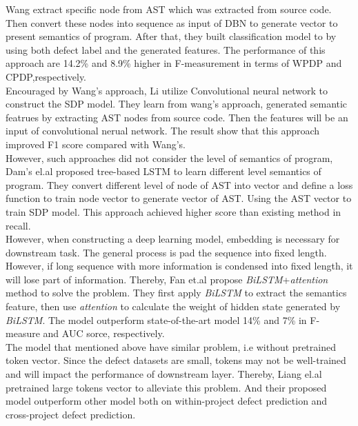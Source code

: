 Wang \cite{} extract specific node from AST which was extracted from source code. Then convert these nodes into sequence as input of DBN to generate vector to present semantics of program. After that, they built classification model to by using both defect label and the generated features. The performance of this approach are 14.2\% and 8.9\% higher in F-measurement in terms of WPDP and CPDP,respectively.\\

Encouraged by Wang's approach, Li \cite{} utilize Convolutional neural network to construct the SDP model. They learn from wang's approach, generated semantic featrues by extracting AST nodes from source code. Then the features will be an input of convolutional nerual network. The result show that this approach improved F1 score compared with Wang's.\\

However, such approaches did not consider the level of semantics of program, Dam's el.al \cite{} proposed tree-based LSTM to learn different level semantics of program. They convert different level of node of AST into vector and define a loss function to train node vector to generate vector of AST. Using the AST vector to train SDP model. This approach achieved higher score than existing method in recall.\\

However, when constructing a deep learning model, embedding is necessary for downstream task. The general process is pad the sequence into fixed length. However, if long sequence with more information is condensed into fixed length, it will lose part of information. Thereby, Fan et.al \cite{} propose \textit{BiLSTM}+\textit{attention} method to solve the problem. They first apply \textit{BiLSTM} to extract the semantics feature, then use \textit{attention} to calculate the weight of hidden state generated by \textit{BiLSTM}. The model outperform  state-of-the-art model 14\% and 7\% in F-measure and AUC sorce, respectively. \\

The model that mentioned above have similar problem, i.e without pretrained token vector. Since the defect datasets are small, tokens may not be well-trained and will impact the performance of downstream layer. Thereby, Liang el.al \cite{} pretrained large tokens vector to alleviate this problem. And their proposed model outperform other model both on within-project defect prediction and cross-project defect prediction. \\

